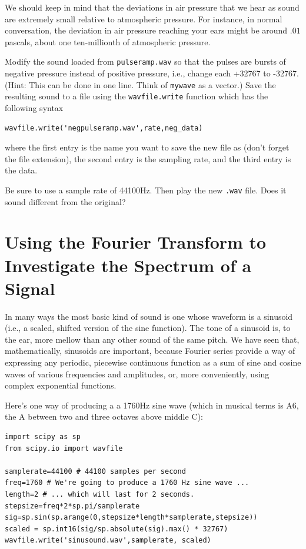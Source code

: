 We should keep in mind that the deviations in air pressure that we hear as sound are extremely small relative to atmospheric pressure. For instance, in normal conversation, the deviation in air pressure reaching your ears might be around $.01$ pascals, about one ten-millionth of atmospheric pressure.

\begin{problem}
Modify the sound loaded from \texttt{pulseramp.wav} so that the pulses are bursts of negative pressure instead of positive pressure, i.e., change each +32767 to -32767. (Hint: This can be done in one line. Think of \texttt{mywave} as a vector.) Save the resulting sound to a file using the \texttt{wavfile.write} function which has the following syntax

\begin{lstlisting}
wavfile.write('negpulseramp.wav',rate,neg_data)
\end{lstlisting}
where the first entry is the name you want to save the new file as (don't forget the file extension), the second entry is the sampling rate, and the third entry is the data.

Be sure to use a sample rate of 44100Hz. Then play the new \texttt{.wav} file. Does it sound different from the original?
\end{problem}

\section*{Using the Fourier Transform to Investigate the Spectrum of a Signal}

In many ways the most basic kind of sound is one whose waveform is a sinusoid (i.e., a scaled, shifted version of the sine function). The tone of a sinusoid is, to the ear, more mellow than any other sound of the same pitch. We have seen that, mathematically, sinusoids are important, because Fourier series provide a way of expressing any periodic, piecewise continuous function as a sum of sine and cosine waves of various frequencies and amplitudes, or, more conveniently, using complex exponential functions.

Here's one way of producing a a 1760Hz sine wave (which in musical terms is A6, the A between two and three octaves above middle C):

\begin{lstlisting}
import scipy as sp
from scipy.io import wavfile

samplerate=44100 # 44100 samples per second
freq=1760 # We're going to produce a 1760 Hz sine wave ...
length=2 # ... which will last for 2 seconds.
stepsize=freq*2*sp.pi/samplerate
sig=sp.sin(sp.arange(0,stepsize*length*samplerate,stepsize))
scaled = sp.int16(sig/sp.absolute(sig).max() * 32767)
wavfile.write('sinusound.wav',samplerate, scaled)
\end{lstlisting}


